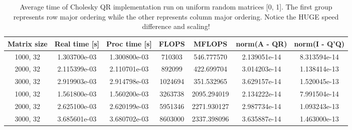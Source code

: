 \documentclass[11pt]{article}
\begin{document}
\begin{table}
  \centering

  \caption{Average time of Cholesky QR implementation run on uniform random matrices [0, 1]. The first group represents row major ordering while the other represents column major ordering. Notice the HUGE speed difference and scaling!}
  \vspace{3mm}

  \label{tab:chol_qr_avg}

  \begin{tabular}{c c c c c c c}
    Matrix size & Real time [s] & Proc time [s] & FLOPS & MFLOPS & norm(A - QR) & norm(I - Q'Q) \\ \hline
    1000, 32 & 1.303700e-03 & 1.300800e-03 & 710303 & 546.777570 & 2.139051e-14 & 8.313594e-14 \\
    2000, 32 & 2.115399e-03 & 2.110701e-03 & 892099 & 422.699704 & 3.014203e-14 & 1.138414e-13 \\
    3000, 32 & 2.919903e-03 & 2.914798e-03 & 1024694 & 351.532965 & 3.629157e-14 & 1.520045e-13 \\ \hline

    1000, 32 & 1.561800e-03 & 1.560200e-03 & 3263738 & 2095.294019 & 2.134222e-14 & 7.991504e-14 \\
    2000, 32 & 2.625100e-03 & 2.620199e-03 & 5951346 & 2271.930127 & 2.987734e-14 & 1.093243e-13 \\
    3000, 32 & 3.685601e-03 & 3.680702e-03 & 8603000 & 2337.398096 & 3.635887e-14 & 1.463000e-13 \\

  \end{tabular}
\end{table}
\end{document}
